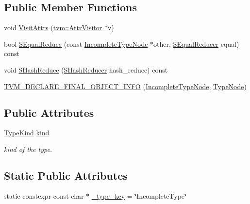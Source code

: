 \subsection*{Public Member Functions}
\begin{DoxyCompactItemize}
\item 
void \hyperlink{classtvm_1_1IncompleteTypeNode_abc1d642d082a67c6fea2b28a9db79542}{Visit\+Attrs} (\hyperlink{classtvm_1_1AttrVisitor}{tvm\+::\+Attr\+Visitor} $\ast$v)
\item 
bool \hyperlink{classtvm_1_1IncompleteTypeNode_a3e0961f93de3f2cd7905cea065df895b}{S\+Equal\+Reduce} (const \hyperlink{classtvm_1_1IncompleteTypeNode}{Incomplete\+Type\+Node} $\ast$other, \hyperlink{classtvm_1_1SEqualReducer}{S\+Equal\+Reducer} equal) const 
\item 
void \hyperlink{classtvm_1_1IncompleteTypeNode_ac9d333742464ab5ce9578938ddc8b55f}{S\+Hash\+Reduce} (\hyperlink{classtvm_1_1SHashReducer}{S\+Hash\+Reducer} hash\+\_\+reduce) const 
\item 
\hyperlink{classtvm_1_1IncompleteTypeNode_afbd1522c6361c9476286344b7bae329c}{T\+V\+M\+\_\+\+D\+E\+C\+L\+A\+R\+E\+\_\+\+F\+I\+N\+A\+L\+\_\+\+O\+B\+J\+E\+C\+T\+\_\+\+I\+N\+FO} (\hyperlink{classtvm_1_1IncompleteTypeNode}{Incomplete\+Type\+Node}, \hyperlink{classtvm_1_1TypeNode}{Type\+Node})
\end{DoxyCompactItemize}
\subsection*{Public Attributes}
\begin{DoxyCompactItemize}
\item 
\hyperlink{namespacetvm_acd267f8d7f55da6ac681239831963279}{Type\+Kind} \hyperlink{classtvm_1_1IncompleteTypeNode_ab5f37175c1fd0dbbbedc2edaa23d33dc}{kind}
\begin{DoxyCompactList}\small\item\em kind of the type. \end{DoxyCompactList}\end{DoxyCompactItemize}
\subsection*{Static Public Attributes}
\begin{DoxyCompactItemize}
\item 
static constexpr const char $\ast$ \hyperlink{classtvm_1_1IncompleteTypeNode_a01b808c3a957b9950fe369dec250d68d}{\+\_\+type\+\_\+key} = \char`\"{}Incomplete\+Type\char`\"{}
\end{DoxyCompactItemize}


